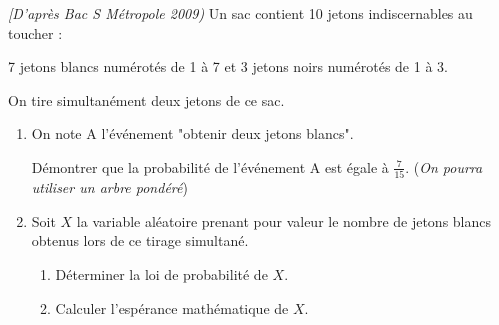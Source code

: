 
%
\textit{[D'après Bac S Métropole 2009)}
Un sac contient 10 jetons indiscernables au toucher :
\par
7 jetons blancs numérotés de 1 à 7 et 3 jetons noirs numérotés de 1 à 3.
\par
On tire simultanément deux jetons de ce sac.
\begin{enumerate}
     \item
     On note A l'événement "obtenir deux jetons blancs".
     \par
     Démontrer que la probabilité de l'événement A est égale à $\frac{7}{15}$. (\textit{On pourra utiliser un arbre pondéré})
     \item
     Soit $X$ la variable aléatoire prenant pour valeur le nombre de jetons blancs obtenus lors de ce tirage simultané.

     \begin{enumerate}[label=\alph*.]
          \item
          Déterminer la loi de probabilité de $X$.
          \item
          Calculer l'espérance mathématique de $X$.
     \end{enumerate}
\end{enumerate}
